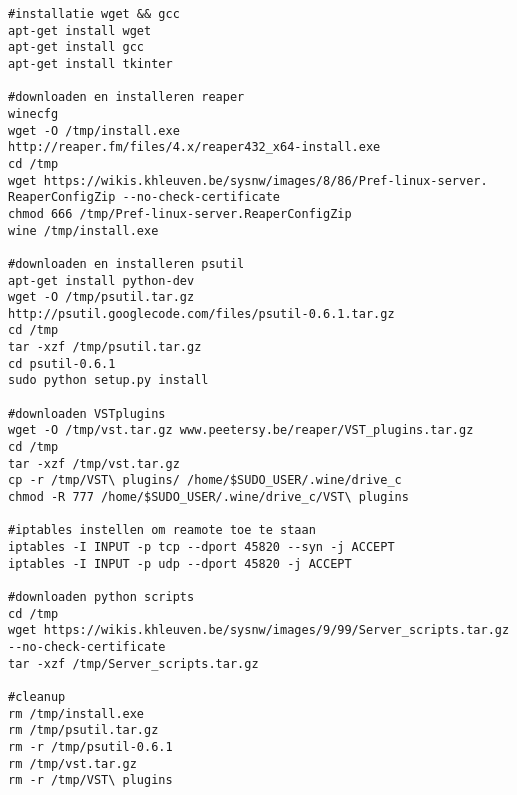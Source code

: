 \documentclass[DIV=calc]{scrartcl}
\begin{document}
\begin{lstlisting}[caption={Script-debian-64bit.sh}, label=Debian installatiescript 64bit]
#installatie wget && gcc
apt-get install wget
apt-get install gcc
apt-get install tkinter
 
#downloaden en installeren reaper
winecfg
wget -O /tmp/install.exe 
http://reaper.fm/files/4.x/reaper432_x64-install.exe
cd /tmp
wget https://wikis.khleuven.be/sysnw/images/8/86/Pref-linux-server.
ReaperConfigZip --no-check-certificate
chmod 666 /tmp/Pref-linux-server.ReaperConfigZip
wine /tmp/install.exe
 
#downloaden en installeren psutil
apt-get install python-dev
wget -O /tmp/psutil.tar.gz 
http://psutil.googlecode.com/files/psutil-0.6.1.tar.gz
cd /tmp
tar -xzf /tmp/psutil.tar.gz
cd psutil-0.6.1
sudo python setup.py install
 
#downloaden VSTplugins
wget -O /tmp/vst.tar.gz www.peetersy.be/reaper/VST_plugins.tar.gz
cd /tmp
tar -xzf /tmp/vst.tar.gz
cp -r /tmp/VST\ plugins/ /home/$SUDO_USER/.wine/drive_c
chmod -R 777 /home/$SUDO_USER/.wine/drive_c/VST\ plugins
 
#iptables instellen om reamote toe te staan
iptables -I INPUT -p tcp --dport 45820 --syn -j ACCEPT
iptables -I INPUT -p udp --dport 45820 -j ACCEPT
 
#downloaden python scripts
cd /tmp
wget https://wikis.khleuven.be/sysnw/images/9/99/Server_scripts.tar.gz 
--no-check-certificate
tar -xzf /tmp/Server_scripts.tar.gz
 
#cleanup
rm /tmp/install.exe
rm /tmp/psutil.tar.gz
rm -r /tmp/psutil-0.6.1
rm /tmp/vst.tar.gz
rm -r /tmp/VST\ plugins
\end{lstlisting}
\end{document}
